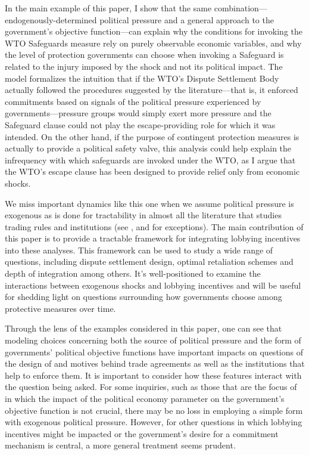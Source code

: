 In the main example of this paper, I show that the same combination---endogenously-determined political pressure and a general approach to the government's objective function---can explain why the conditions for invoking the WTO Safeguards measure rely on purely observable economic variables, and why the level of protection governments can choose when invoking a Safeguard is related to the injury imposed by the shock and not its political impact. The model formalizes the intuition that if the WTO's Dispute Settlement Body actually followed the procedures suggested by the literature---that is, it enforced commitments based on signals of the political pressure experienced by governments---pressure groups would simply exert more pressure and the Safeguard clause could not play the escape-providing role for which it was intended. On the other hand, if the purpose of contingent protection measures is actually to provide a political safety valve, this analysis could help explain the infrequency with which safeguards are invoked under the WTO, as I argue that the WTO's escape clause has been designed to provide relief only from economic shocks.

We miss important dynamics like this one when we assume political pressure is exogenous as is done for tractability in almost all the literature that studies trading rules and institutions (see \Textcite{mrc2007}, \Textcite{lt} and \Textcite{buzard2013a} for exceptions). The main contribution of this paper is to provide a tractable framework for integrating lobbying incentives into these analyses. This framework can be used to study a wide range of questions, including dispute settlement design, optimal retaliation schemes and depth of integration among others. It's well-positioned to examine the interactions between exogenous shocks and lobbying incentives and will be useful for shedding light on questions surrounding how governments choose among protective measures over time.

Through the lens of the examples considered in this paper, one can see that modeling choices concerning both the source of political pressure and the form of governments' political objective functions have important impacts on questions of the design of and motives behind trade agreements as well as the institutions that help to enforce them. It is important to consider how these features interact with the question being asked. For some inquiries, such as those that are the focus of \Textcite{ms2011, ms2012a} in which the impact of the political economy parameter on the government's objective function is not crucial, there may be no loss in employing a simple form with exogenous political pressure. However, for other questions in which lobbying incentives might be impacted or the government's desire for a commitment mechanism is central, a more general treatment seems prudent.

